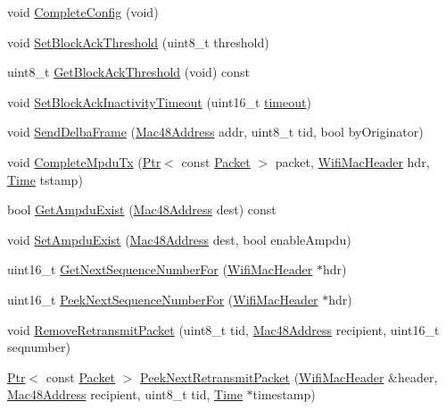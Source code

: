 \begin{DoxyCompactItemize}
\item 
void \hyperlink{classns3_1_1EdcaTxopN_aeca53fddb95468e9e56ee452adf8b263}{Complete\+Config} (void)
\item 
void \hyperlink{classns3_1_1EdcaTxopN_a092b5466cdec7451630131c6b27be6a2}{Set\+Block\+Ack\+Threshold} (uint8\+\_\+t threshold)
\item 
uint8\+\_\+t \hyperlink{classns3_1_1EdcaTxopN_ab89d2b3264e7bf282c671851fad79ef2}{Get\+Block\+Ack\+Threshold} (void) const 
\item 
void \hyperlink{classns3_1_1EdcaTxopN_a95f781c129cf00191fb7eb4fc215e774}{Set\+Block\+Ack\+Inactivity\+Timeout} (uint16\+\_\+t \hyperlink{openflow-switch_8cc_a386d174ae121d1cfa279074b7e209714}{timeout})
\item 
void \hyperlink{classns3_1_1EdcaTxopN_a3a14d846328f0d5447f44d7c2f3c607e}{Send\+Delba\+Frame} (\hyperlink{classns3_1_1Mac48Address}{Mac48\+Address} addr, uint8\+\_\+t tid, bool by\+Originator)
\item 
void \hyperlink{classns3_1_1EdcaTxopN_a75e799923353480f29baf91ea1d43e9f}{Complete\+Mpdu\+Tx} (\hyperlink{classns3_1_1Ptr}{Ptr}$<$ const \hyperlink{classns3_1_1Packet}{Packet} $>$ packet, \hyperlink{classns3_1_1WifiMacHeader}{Wifi\+Mac\+Header} hdr, \hyperlink{classns3_1_1Time}{Time} tstamp)
\item 
bool \hyperlink{classns3_1_1EdcaTxopN_ac58af0b7a2b0d0849b13db6ec3d12939}{Get\+Ampdu\+Exist} (\hyperlink{classns3_1_1Mac48Address}{Mac48\+Address} dest) const 
\item 
void \hyperlink{classns3_1_1EdcaTxopN_ace47465ff464e597066b36678587154c}{Set\+Ampdu\+Exist} (\hyperlink{classns3_1_1Mac48Address}{Mac48\+Address} dest, bool enable\+Ampdu)
\item 
uint16\+\_\+t \hyperlink{classns3_1_1EdcaTxopN_a809758d4c7fe1c7663305c8a0df16e55}{Get\+Next\+Sequence\+Number\+For} (\hyperlink{classns3_1_1WifiMacHeader}{Wifi\+Mac\+Header} $\ast$hdr)
\item 
uint16\+\_\+t \hyperlink{classns3_1_1EdcaTxopN_a2498de1dde0c880d25b25844f24c0c81}{Peek\+Next\+Sequence\+Number\+For} (\hyperlink{classns3_1_1WifiMacHeader}{Wifi\+Mac\+Header} $\ast$hdr)
\item 
void \hyperlink{classns3_1_1EdcaTxopN_ac6cda0f8d80f47bcb1d8ee3f30b8de7e}{Remove\+Retransmit\+Packet} (uint8\+\_\+t tid, \hyperlink{classns3_1_1Mac48Address}{Mac48\+Address} recipient, uint16\+\_\+t seqnumber)
\item 
\hyperlink{classns3_1_1Ptr}{Ptr}$<$ const \hyperlink{classns3_1_1Packet}{Packet} $>$ \hyperlink{classns3_1_1EdcaTxopN_a97913133d458fe438bab74807be602aa}{Peek\+Next\+Retransmit\+Packet} (\hyperlink{classns3_1_1WifiMacHeader}{Wifi\+Mac\+Header} \&header, \hyperlink{classns3_1_1Mac48Address}{Mac48\+Address} recipient, uint8\+\_\+t tid, \hyperlink{classns3_1_1Time}{Time} $\ast$timestamp)

\end{DoxyCompactItemize}
